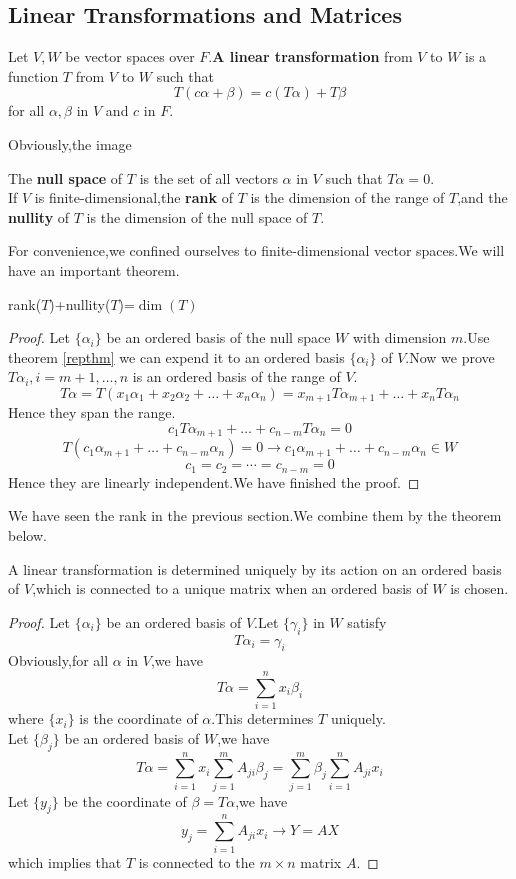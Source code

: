 \documentclass{article}
\begin{document}
\subsection{Linear Transformations and Matrices}
\begin{dde}
	Let $V,W$ be vector spaces over $F$.\textbf{A linear transformation} from $V$ to $W$ is a function $T$ from $V$ to $W$ such that
	\[T(c\alpha+\beta)=c(T\alpha)+T\beta\]
	for all $\alpha,\beta$ in $V$ and $c$ in $F$.
\end{dde}
Obviously,the image 
\begin{dde}
	The \textbf{null space} of $T$ is the set of all vectors $\alpha$ in $V$ such that $T\alpha=0$.\\
	If $V$ is finite-dimensional,the \textbf{rank} of $T$ is the dimension of the range of $T$,and the \textbf{nullity} of $T$ is the dimension of the null space of $T$.
\end{dde}
For convenience,we confined ourselves to finite-dimensional vector spaces.We will have an important theorem.
\begin{thm}\label{dimthm}
	rank($T$)+nullity($T$)=$\dim(T)$
\end{thm}
\begin{proof}
	Let $\{\alpha_i\}$ be an ordered basis of the null space $W$ with dimension $m$.Use theorem \ref{repthm} we can expend it to an ordered basis $\{\alpha_{i}\}$ of $V$.Now we prove $T\alpha_i,i=m+1,\dots,n$ is an ordered basis of the range of $V$.
	\[T\alpha=T(x_1\alpha_1+x_2\alpha_2+\dots+x_n\alpha_n)=x_{m+1}T\alpha_{m+1}+\dots+x_nT\alpha_n\]
	Hence they span the range.
	\[c_1T\alpha_{m+1}+\dots+c_{n-m}T\alpha_n=0\]
	\[T(c_1\alpha_{m+1}+\dots+c_{n-m}\alpha_n)=0\rightarrow c_1\alpha_{m+1}+\dots+c_{n-m}\alpha_n\in W\]
	\[c_1=c_2=\cdots=c_{n-m}=0\]
	Hence they are linearly independent.We have finished the proof.
\end{proof}
We have seen the rank in the previous section.We combine them by the theorem below. 
\begin{thm}
	A linear transformation is determined uniquely by its action on an ordered basis of $V$,which is connected to a unique matrix when an ordered basis of $W$ is chosen.
\end{thm}
\begin{proof}
	Let $\{\alpha_i\}$ be an ordered basis of $V$.Let $\{\gamma_i\}$ in $W$ satisfy
	\[T\alpha_i=\gamma_i\]
	Obviously,for all $\alpha$ in $V$,we have
	\[T\alpha=\sum\limits_{i=1}^nx_i\beta_i\]
	where $\{x_i\}$ is the coordinate of $\alpha$.This determines $T$ uniquely.\\
	Let $\{\beta_j\}$ be an ordered basis of $W$,we have
	\[T\alpha=\sum\limits_{i=1}^nx_i\sum\limits_{j=1}^mA_{ji}\beta_j=\sum\limits_{j=1}^m\beta_j\sum\limits_{i=1}^nA_{ji}x_i\]
	Let $\{y_j\}$ be the coordinate of $\beta=T\alpha$,we have
	\[y_j=\sum\limits_{i=1}^nA_{ji}x_i\rightarrow Y=AX\]
	which implies that $T$ is connected to the $m\times n$ matrix $A$.
\end{proof}
\end{document}
